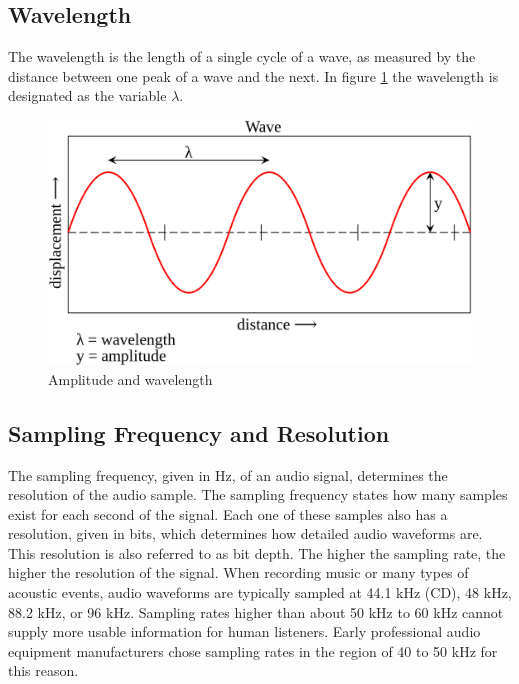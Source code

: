 \subsection{Wavelength}
\label{sub:Wavelength}

The wavelength is the length of a single cycle of a wave, as measured by the distance between one peak of a wave and the next. In figure \ref{fig:Amplitude-Wavelenght} the wavelength is designated as the variable $\lambda$.

\begin{figure}[htbp]
	\centering
	\includegraphics[scale=0.25]{baa-documentation/img/Amplitude.png}
	\caption[Amplitude and wavelength illustrated]{Amplitude and wavelength \footnotemark}
	\label{fig:Amplitude-Wavelenght}
\end{figure}

\subsection{Sampling Frequency and Resolution}
\label{sub:Sampling-Frequency-Resolution}

The sampling frequency, given in \gls{Hz}, of an audio signal, determines the resolution of the audio sample. The sampling frequency states how many samples exist for each second of the signal. Each one of these samples also has a resolution, given in bits, which determines how detailed audio waveforms are. This resolution is also referred to as bit depth. The higher the sampling rate, the higher the resolution of the signal. When recording music or many types of acoustic events, audio waveforms are typically sampled at 44.1 kHz (CD), 48 kHz, 88.2 kHz, or 96 kHz. Sampling rates higher than about 50 kHz to 60 kHz cannot supply more usable information for human listeners. Early professional audio equipment manufacturers chose sampling rates in the region of 40 to 50 kHz for this reason. 


